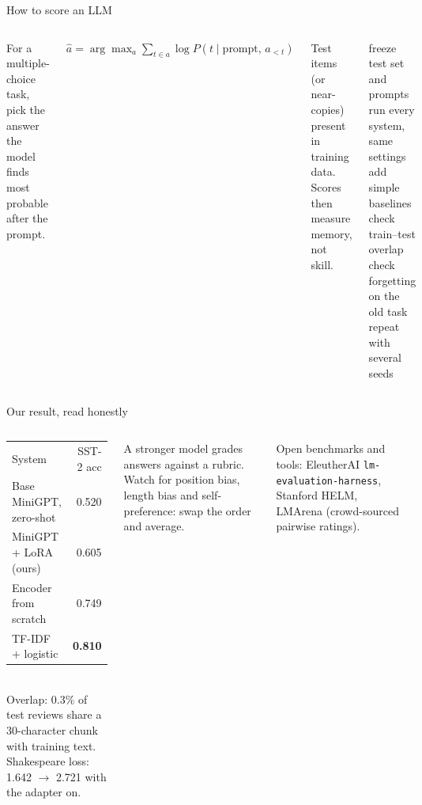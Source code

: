 \documentclass[aspectratio=169,11pt]{beamer}
\newcommand{\rTfidf}{0.810}
\newcommand{\rEnc}{0.749}
\newcommand{\rBase}{0.520}
\newcommand{\rLora}{0.605}
\newcommand{\rForgetBase}{1.642}
\newcommand{\rForgetLora}{2.721}
\begin{document}

\begin{frame}{How to score an LLM}
\begin{columns}[T]
\begin{bdef}
For a multiple-choice task, pick the answer the model finds most probable after the prompt.
\end{bdef}
\begin{bmath}[Score]
$\hat a=\arg\max_{a}\sum_{t\in a}\log P(t\mid\text{prompt},\,a_{<t})$
\end{bmath}
\begin{bdef}[Contamination]
Test items (or near-copies) present in training data. Scores then measure memory, not skill.
\end{bdef}
\begin{balgo}
\begin{algorithmic}[1]
\State freeze test set and prompts
\State run every system, same settings
\State add simple baselines
\State check train--test overlap
\State check forgetting on the old task
\State repeat with several seeds
\end{algorithmic}
\end{balgo}
\end{columns}
\end{frame}

\begin{frame}{Our result, read honestly}
\begin{columns}[T]
\begin{bres}
\begin{tabular}{lr}
System & SST-2 acc\\
Base MiniGPT, zero-shot & \rBase\\
MiniGPT + LoRA (ours) & \rLora\\
Encoder from scratch & \rEnc\\
TF-IDF + logistic & \textbf{\rTfidf}\\
\end{tabular}\\[2pt]
Overlap: 0.3\% of test reviews share a 30-character chunk with training text.\\
Shakespeare loss: \rForgetBase{} $\rightarrow$ \rForgetLora{} with the adapter on.
\end{bres}
\begin{bdef}
A stronger model grades answers against a rubric. Watch for position bias, length bias and self-preference: swap the order and average.
\end{bdef}
\begin{bapp}
Open benchmarks and tools: EleutherAI \texttt{lm-evaluation-harness}, Stanford HELM, LMArena (crowd-sourced pairwise ratings).
\end{bapp}
\end{columns}
\end{frame}
\end{document}
